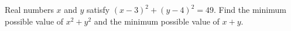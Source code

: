 Real numbers $x$ and $y$ satisfy $(x-3)^2+(y-4)^2=49$. Find the minimum possible value of $x^2+y^2$ and the minimum possible value of $x+y$.
